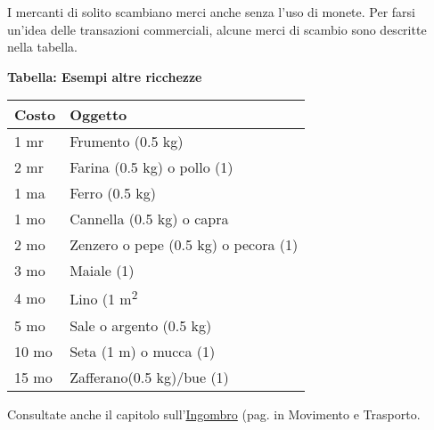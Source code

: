 \begin{multicols}{2}
I mercanti di solito scambiano merci anche senza l'uso di monete.
Per farsi un'idea delle transazioni commerciali, alcune merci di scambio sono descritte nella tabella.

\medskip

\textbf{Tabella: Esempi altre ricchezze}

\medskip

\begin{tabular}{ll}
\textbf{Costo} & \textbf{Oggetto}\\
\toprule
1 mr & Frumento (0.5 kg)\\
2 mr & Farina (0.5 kg) o pollo (1)\\
1 ma & Ferro (0.5 kg)\\
1 mo & Cannella (0.5 kg) o capra \\
2 mo & Zenzero o pepe (0.5 kg) o pecora (1)\\
3 mo & Maiale (1) \\
4 mo & Lino (1 m\textsuperscript{2}\\
5 mo & Sale o argento (0.5 kg) \\
10 mo& Seta (1 m) o mucca (1)\\
15 mo& Zafferano(0.5 kg)/bue (1)
\end{tabular}

\medskip

Consultate anche il capitolo sull'\hyperlink{ingombro}{Ingombro} (pag. \pageref{ingombro} in Movimento e Trasporto.

\end{multicols}

\pagebreak
